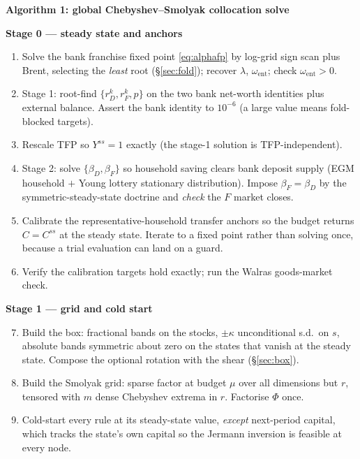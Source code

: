 \documentclass[10pt,a4paper]{article}
\theoremstyle{definition}
\theoremstyle{plain}
\theoremstyle{remark}
\begin{document}
\begin{framed}
\footnotesize
\noindent\textbf{Algorithm 1: global Chebyshev--Smolyak collocation solve}

\medskip
\noindent\textbf{Stage 0 --- steady state and anchors}
\begin{enumerate}\itemsep1pt
\item Solve the bank franchise fixed point \eqref{eq:alphafp} by log-grid sign scan plus
Brent, selecting the \emph{least} root (\S\ref{sec:fold}); recover $\lambda$,
$\omega_{\mathrm{ent}}$; check $\omega_{\mathrm{ent}}>0$.
\item Stage 1: root-find $\{r^k_D, r^k_F, p\}$ on the two bank net-worth identities plus
external balance. Assert the bank identity to $10^{-6}$ (a large value means fold-blocked
targets).
\item Rescale TFP so $Y^{ss}=1$ exactly (the stage-1 solution is TFP-independent).
\item Stage 2: solve $\{\beta_D,\beta_F\}$ so household saving clears bank deposit supply
(EGM household $+$ Young lottery stationary distribution). Impose $\beta_F=\beta_D$ by the
symmetric-steady-state doctrine and \emph{check} the $F$ market closes.
\item Calibrate the representative-household transfer anchors so the budget returns
$C=C^{ss}$ at the steady state. Iterate to a fixed point rather than solving once, because a
trial evaluation can land on a guard.
\item Verify the calibration targets hold exactly; run the Walras goods-market check.
\end{enumerate}

\medskip
\noindent\textbf{Stage 1 --- grid and cold start}
\begin{enumerate}\setcounter{enumi}{6}\itemsep1pt
\item Build the box: fractional bands on the stocks, $\pm\kappa$ unconditional s.d.\ on $s$,
absolute bands symmetric about zero on the states that vanish at the steady state. Compose the
optional rotation with the shear (\S\ref{sec:box}).
\item Build the Smolyak grid: sparse factor at budget $\mu$ over all dimensions but $r$,
tensored with $m$ dense Chebyshev extrema in $r$. Factorise $\Phi$ once.
\item Cold-start every rule at its steady-state value, \emph{except} next-period capital,
which tracks the state's own capital so the Jermann inversion is feasible at every node.
\end{enumerate}


\end{framed}
\end{document}
